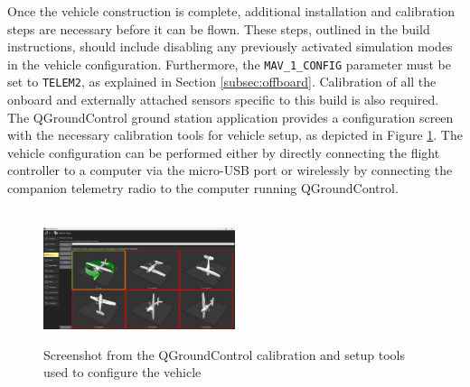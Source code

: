 Once the vehicle construction is complete, additional installation and calibration steps are necessary before it can be flown. These steps, outlined in the build instructions, should include disabling any previously activated simulation modes in the vehicle configuration. Furthermore, the \texttt{MAV\_1\_CONFIG} parameter must be set to \texttt{TELEM2}, as explained in Section \ref{subsec:offboard}. Calibration of all the onboard and externally attached sensors specific to this build is also required. The QGroundControl ground station application provides a configuration screen with the necessary calibration tools for vehicle setup, as depicted in Figure \ref{fig:qgc-config}. The vehicle configuration can be performed either by directly connecting the flight controller to a computer via the micro-USB port or wirelessly by connecting the companion telemetry radio to the computer running QGroundControl.


\begin{figure}[H]
  \centering
  \\
  \includegraphics[width=0.5\textwidth, keepaspectratio]{img/qgc-config-2.png}
  \caption{Screenshot from the QGroundControl calibration and setup tools used to configure the vehicle}\label{fig:qgc-config}
\end{figure}


